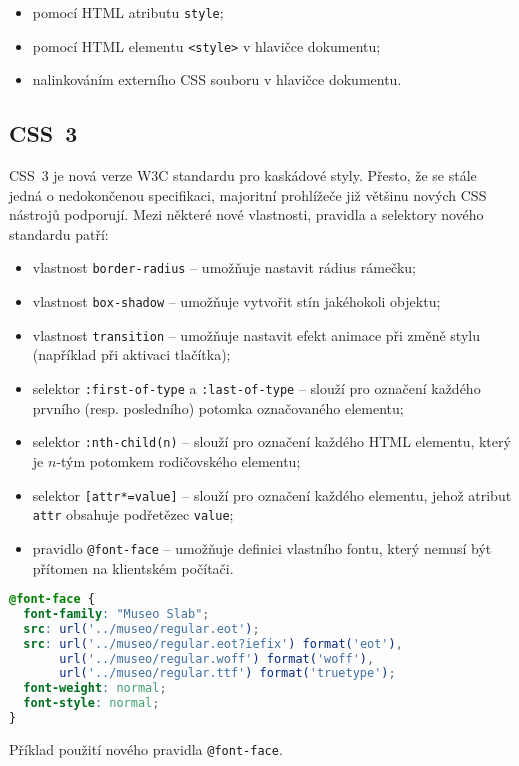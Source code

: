 \begin{itemize}
    \item pomocí HTML atributu \texttt{style};
    \item pomocí HTML elementu \texttt{<style>} v hlavičce dokumentu;
    \item nalinkováním externího CSS souboru v hlavičce dokumentu.
\end{itemize}

\subsection{CSS~3}

CSS~3 je nová verze W3C standardu pro kaskádové styly. Přesto, že se stále jedná o nedokončenou specifikaci, majoritní prohlížeče již většinu nových CSS nástrojů podporují. Mezi některé nové vlastnosti, pravidla a selektory nového standardu patří:

\begin{itemize}
    \item vlastnost \texttt{border-radius} -- umožňuje nastavit rádius rámečku;
    \item vlastnost \texttt{box-shadow} -- umožňuje vytvořit stín jakéhokoli objektu;
    \item vlastnost \texttt{transition} -- umožňuje nastavit efekt animace při změně stylu (například při aktivaci tlačítka);
    \item selektor \texttt{:first-of-type} a \texttt{:last-of-type} -- slouží pro označení každého prvního (resp. posledního) potomka označovaného elementu;
    \item selektor \texttt{:nth-child(n)} -- slouží pro označení každého HTML elementu, který je $n$-tým potomkem rodičovského elementu;
    \item selektor \texttt{[attr*=value]} -- slouží pro označení každého elementu, jehož atribut \texttt{attr} obsahuje podřetězec \texttt{value};
    \item pravidlo \texttt{@font-face} -- umožňuje definici vlastního fontu, který nemusí být přítomen na klientském počítači.
\end{itemize}

\begin{example}
    \centering
    \begin{lstlisting}[language=css]
@font-face {
  font-family: "Museo Slab";
  src: url('../museo/regular.eot');
  src: url('../museo/regular.eot?iefix') format('eot'),
       url('../museo/regular.woff') format('woff'),
       url('../museo/regular.ttf') format('truetype');
  font-weight: normal;
  font-style: normal;
}
    \end{lstlisting}
    \caption{Příklad použití nového pravidla \texttt{@font-face}.}
    \label{example:font-face}
\end{example}

